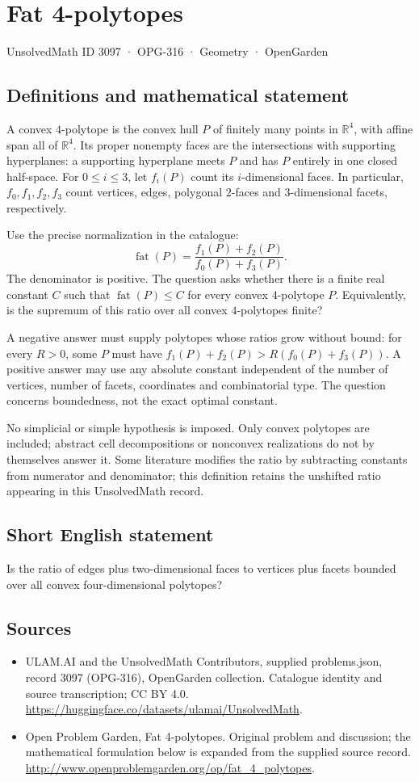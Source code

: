\documentclass[11pt,a4paper]{article}
\begin{document}
\section*{Fat 4-polytopes}\label{3097}
{\small UnsolvedMath ID 3097 · OPG-316 · Geometry · OpenGarden}
\subsection{Definitions and mathematical statement}
A convex $4$-polytope is the convex hull $P$ of finitely many points in
$\mathbb R^4$, with affine span all of $\mathbb R^4$. Its proper nonempty
faces are the intersections with supporting hyperplanes: a supporting
hyperplane meets $P$ and has $P$ entirely in one closed half-space.
For $0\le i\le3$, let $f_i(P)$ count its $i$-dimensional faces.
In particular, $f_0,f_1,f_2,f_3$ count vertices, edges, polygonal
$2$-faces and $3$-dimensional facets, respectively.

Use the precise normalization in the catalogue:
\[
 \operatorname{fat}(P)=\frac{f_1(P)+f_2(P)}{f_0(P)+f_3(P)}.
\]
The denominator is positive. The question asks whether there is a
finite real constant $C$ such that $\operatorname{fat}(P)\le C$ for
every convex $4$-polytope $P$.
Equivalently, is the supremum of this ratio over all convex
$4$-polytopes finite?

A negative answer must supply polytopes whose ratios grow without bound:
for every $R>0$, some $P$ must have $f_1(P)+f_2(P)>R(f_0(P)+f_3(P))$.
A positive answer may use any absolute constant independent of the
number of vertices, number of facets, coordinates and combinatorial type.
The question concerns boundedness, not the exact optimal constant.

No simplicial or simple hypothesis is imposed. Only convex polytopes are
included; abstract cell decompositions or nonconvex realizations do not
by themselves answer it. Some literature modifies the ratio by subtracting
constants from numerator and denominator; this definition retains the
unshifted ratio appearing in this UnsolvedMath record.
\subsection{Short English statement}
Is the ratio of edges plus two-dimensional faces to vertices plus facets bounded over all convex four-dimensional polytopes?
\subsection{Sources}
\begin{itemize}
\item[S1] ULAM.AI and the UnsolvedMath Contributors, supplied problems.json, record 3097 (OPG-316), OpenGarden collection. Catalogue identity and source transcription; CC BY 4.0.
\url{https://huggingface.co/datasets/ulamai/UnsolvedMath}.
\item[S2] Open Problem Garden, Fat 4-polytopes. Original problem and discussion; the mathematical formulation below is expanded from the supplied source record.
\url{http://www.openproblemgarden.org/op/fat_4_polytopes}.
\end{itemize}
\end{document}
